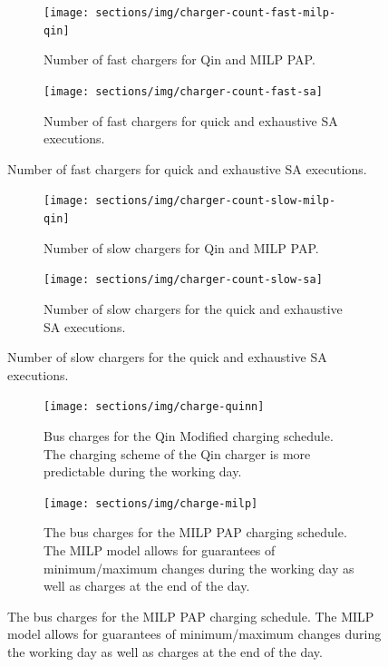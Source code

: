 \documentclass[11pt,a4paper,final]{article}
\begin{document}
\begin{figure}
    \begin{subfigure}[t]{\textwidth}
    \centering
        \texttt{[image: sections/img/charger-count-fast-milp-qin]}
        \caption{Number of fast chargers for Qin and MILP PAP.}
        \label{subfig:fast-charger-usage-milp-qinn}
    \end{subfigure}

    \begin{subfigure}[t]{\textwidth}
    \centering
        \texttt{[image: sections/img/charger-count-fast-sa]}
        \caption{Number of fast chargers for quick and exhaustive SA executions.}
        \label{subfig:fast-charger-usage-sa}
    \end{subfigure}
\end{figure}

\begin{figure}
    \begin{subfigure}[t]{\textwidth}
    \centering
        \texttt{[image: sections/img/charger-count-slow-milp-qin]}
        \caption{Number of slow chargers for Qin and MILP PAP.}
        \label{subfig:slow-charger-usage-milp-qinn}
    \end{subfigure}
    \begin{subfigure}[t]{\textwidth}
    \centering
        \texttt{[image: sections/img/charger-count-slow-sa]}
        \caption{Number of slow chargers for the quick and exhaustive SA executions.}
        \label{subfig:slow-charger-usage-sa}
    \end{subfigure}
\end{figure}

\begin{figure}
  \begin{subfigure}[t]{\textwidth}
    \centering
    \texttt{[image: sections/img/charge-quinn]}
    \caption{Bus charges for the Qin Modified charging schedule. The charging scheme of the Qin charger is more predictable during the working day.}
    \label{subfig:qin-charge}
  \end{subfigure}
  \hfill
  \begin{subfigure}[t]{\textwidth}
    \centering
    \texttt{[image: sections/img/charge-milp]}
    \caption{The bus charges for the MILP PAP charging schedule. The MILP model allows for guarantees of minimum/maximum changes during the working day as well as charges at the end of the day.}
    \label{subfig:milp-charge}
  \end{subfigure}
  \hfill
\end{figure}
\end{document}

